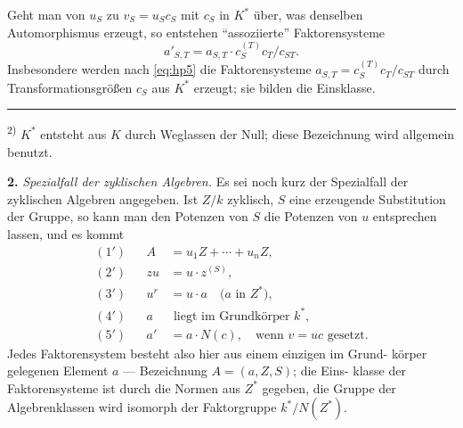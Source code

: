\documentclass[12pt,a4paper]{article}
\theoremstyle{plain}
\begin{document}
Geht man von $u_S$ zu $v_S = u_S c_S$ mit $c_S$ in $K^*$ \"uber, was denselben
Automorphismus erzeugt, so entstehen ``assoziierte'' Faktorensysteme
\begin{equation}\label{eq:hp5}
a'_{S,T} = a_{S,T} \cdot c_S^{(T)} c_T / c_{ST}.
\end{equation}
Insbesondere werden nach \eqref{eq:hp5} die Faktorensysteme $a_{S,T} = c_S^{(T)} c_T / c_{ST}$
durch Transformationsgr\"o\ss en $c_S$ aus $K^*$ erzeugt; sie bilden die Einsklasse.

\bigskip
\noindent\rule{0.3\textwidth}{0.4pt}

{\small
\textsuperscript{2)} $K^*$ entsteht aus $K$ durch Weglassen der Null; diese Bezeichnung wird allgemein benutzt.
}


\medskip
\noindent\textbf{2.}\hspace{0.5em}%
\emph{Spezialfall der zyklischen Algebren.}\hspace{0.5em}%
Es sei noch kurz der Spezialfall der zyklischen Algebren angegeben.
Ist $Z/k$ zyklisch, $S$ eine erzeugende Substitution der Gruppe, so kann man
den Potenzen von $S$ die Potenzen von $u$ entsprechen lassen, und es kommt
\begin{align}
(1') && A &= u_1 Z + \cdots + u_n Z, \\
(2') && z u &= u \cdot z^{(S)}, \\
(3') && u^r &= u \cdot a \quad \text{($a$ in $Z^*$)}, \\
(4') && a &\text{ liegt im Grundk\"orper $k^*$}, \\
(5') && a' &= a \cdot N(c), \quad \text{wenn $v = uc$ gesetzt.}
\end{align}
Jedes Faktorensystem besteht also hier aus einem einzigen im Grund-
k\"orper gelegenen Element $a$ --- Bezeichnung $A = (a, Z, S)$; die Eins-
klasse der Faktorensysteme ist durch die Normen aus $Z^*$ gegeben, die
Gruppe der Algebrenklassen wird isomorph der Faktorgruppe $k^*/N(Z^*)$.
\end{document}
